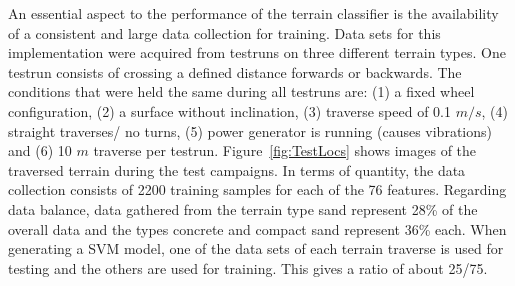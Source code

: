 \documentclass{article}
\begin{document}
An essential aspect to the performance of the terrain classifier is the availability of a consistent and large data collection  for training. Data sets for this implementation were acquired from testruns on three different terrain types. One testrun consists of crossing a defined distance forwards or backwards. The conditions that were held the same during all testruns are: (1) a fixed wheel configuration, (2) a surface without inclination, (3) traverse speed of 0.1 $m/s$, (4) straight traverses/ no turns, (5) power generator is running (causes vibrations) and (6) 10 $m$ traverse per testrun. Figure~\ref{fig:TestLocs} shows images of the traversed terrain during the test campaigns. In terms of quantity, the data collection consists of 2200 training samples for each of the 76 features. Regarding data balance, data gathered from the terrain type sand represent 28\% of the overall data and the types concrete and compact sand represent 36\% each. 
When generating a SVM model, one of the data sets of each terrain traverse is used for testing and the others are used for training. This gives a ratio of about 25/75.
\end{document}
